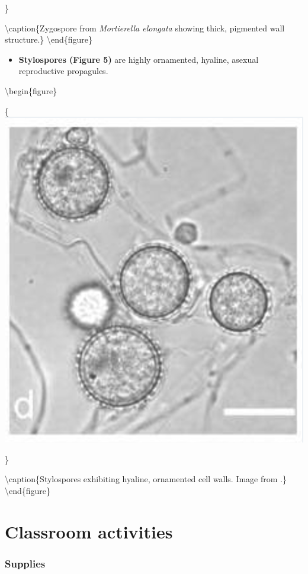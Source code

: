 \documentclass[]{book}
\providecommand{\tightlist}{%
  \setlength{\itemsep}{0pt}\setlength{\parskip}{0pt}}
\begin{document}
\}

\textbackslash caption\{Zygospore from \emph{Mortierella elongata} showing thick, pigmented wall structure.\}\label{fig:ch8fig4}
\textbackslash end\{figure\}

\begin{itemize}
\tightlist
\item
  \textbf{Stylospores (Figure 5) } are highly ornamented, hyaline, asexual reproductive propagules.
\end{itemize}

\textbackslash begin\{figure\}

\{\centering \includegraphics[width=6.72in]{img/Ch8_Fig5}

\}

\textbackslash caption\{Stylospores exhibiting hyaline, ornamented cell walls. Image from \citet{Wagner_2013}.\}\label{fig:ch8fig5}
\textbackslash end\{figure\}

\hypertarget{classroom-activities}{%
\section{Classroom activities}\label{classroom-activities}}

\hypertarget{supplies-3}{%
\subsubsection{Supplies}\label{supplies-3}}
\end{document}
